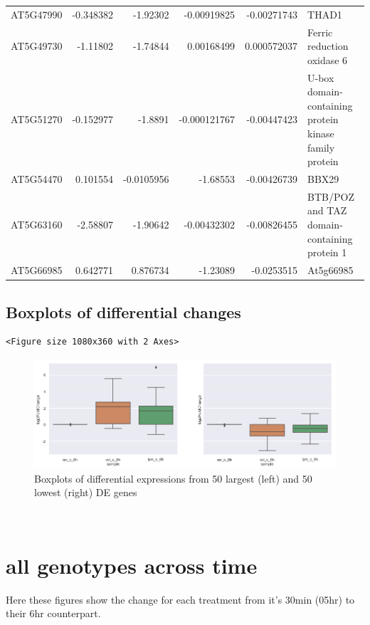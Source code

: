 \documentclass[11pt]{article}
\begin{document}
\begin{center}
\begin{tabular}{lrrrrl}
AT5G47990 & -0.348382 & -1.92302 & -0.00919825 & -0.00271743 & THAD1\\
AT5G49730 & -1.11802 & -1.74844 & 0.00168499 & 0.000572037 & Ferric reduction oxidase 6\\
AT5G51270 & -0.152977 & -1.8891 & -0.000121767 & -0.00447423 & U-box domain-containing protein kinase family protein\\
AT5G54470 & 0.101554 & -0.0105956 & -1.68553 & -0.00426739 & BBX29\\
AT5G63160 & -2.58807 & -1.90642 & -0.00432302 & -0.00826455 & BTB/POZ and TAZ domain-containing protein 1\\
AT5G66985 & 0.642771 & 0.876734 & -1.23089 & -0.0253515 & At5g66985\\
\end{tabular}
\end{center}


\subsection{Boxplots of differential changes}
\label{sec:orgaab3217}

\begin{verbatim}
<Figure size 1080x360 with 2 Axes>
\end{verbatim}


\begin{figure}[htbp]
\centering
\includegraphics[width=.9\linewidth]{obipy-resources/pairings_6hr_lym_boxplots.png}
\caption{\label{pairings_6hr_lym_boxplots}
Boxplots of differential expressions from 50 largest (left) and 50 lowest (right) DE genes}
\end{figure}


\clearpage\\
\section{all genotypes across time}
\label{sec:org1bd2d46}

Here these figures show the change for each treatment from it's 30min (05hr) to their 6hr counterpart.\\
\end{document}
